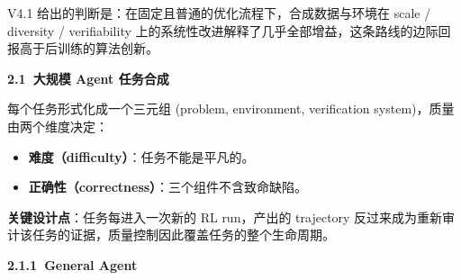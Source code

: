 \documentclass[zihao=false,fontset=windows]{ctexart}
\newcommand{\incode}[1]{\colorbox{inlinebg}{\ttfamily\small #1}}
\begin{document}
\begin{feishuquote}

V4.1 给出的判断是：在固定且普通的优化流程下，合成数据与环境在 scale / diversity / verifiability 上的系统性改进解释了几乎全部增益，这条路线的边际回报高于后训练的算法创新。\par
\end{feishuquote}

\par{}\vspace{0.8em}\noindent \begin{tcolorbox}[boxrule=0pt,arc=3pt,colback=callOrange,left=3pt,right=3pt,top=2pt,bottom=2pt,before skip=0pt,after skip=0pt]{\bfseries \textcolor{feishuBlue}{2.1}\ 大规模 Agent 任务合成}\end{tcolorbox}\par\vspace{0.28em}

每个任务形式化成一个三元组 \incode{(problem, environment, verification system)}，质量由两个维度决定：\par
\begin{itemize}
\item 
\textbf{难度（difficulty）}：任务不能是平凡的。\par
\item 
\textbf{正确性（correctness）}：三个组件不含致命缺陷。\par
\end{itemize}

\textbf{关键设计点}：任务每进入一次新的 RL run，产出的 trajectory 反过来成为重新审计该任务的证据，质量控制因此覆盖任务的整个生命周期。\par

\par{}\vspace{0.8em}\noindent \begin{tcolorbox}[boxrule=0pt,arc=3pt,colback=callGreen,left=3pt,right=3pt,top=2pt,bottom=2pt,before skip=0pt,after skip=0pt]{\bfseries \textcolor{feishuBlue}{2.1.1}\ General Agent}\end{tcolorbox}\par\vspace{0.28em}
\end{document}
